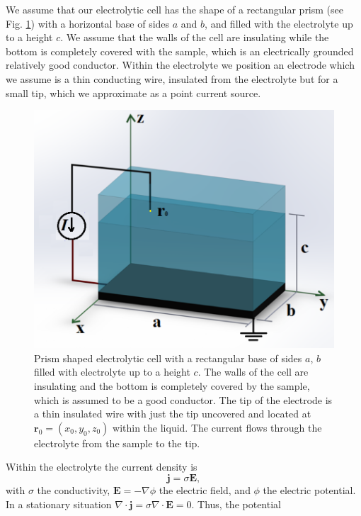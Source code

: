 \documentclass[review,sort&compress]{cas-sc}
\begin{document}
We assume that our electrolytic cell has the shape of a rectangular
prism (see Fig. \ref{f:celda}) with a horizontal base of sides $a$ and $b$, and
filled with the electrolyte up to a height $c$. We assume that the
walls of the cell are insulating while the bottom is completely
covered with the sample, which is an
electrically grounded relatively good conductor. Within the electrolyte we position an electrode
which we assume is a thin conducting wire, insulated from the electrolyte
but for a small tip, which we approximate as a
point current source.
\begin{figure}
  \centering
  \includegraphics[width=\textwidth]{fig1.png}
  \caption{Prism shaped electrolytic cell with a rectangular base of
    sides $a$, $b$ filled with electrolyte up to a height $c$. The
    walls of the cell are insulating and the bottom is completely
    covered by the sample, which is assumed to be a good
    conductor. The tip of the electrode is a thin insulated wire
    with just the tip uncovered and located at $\bm r_0=(x_0,y_0,z_0)$ within the
    liquid. The current flows through the electrolyte from the sample
    to the tip.}
  \label{f:celda}
\end{figure}
Within the electrolyte the current density is
\begin{equation}
  \label{eq:j}
  \bm j=\sigma\bm E,
\end{equation}
with
$\sigma$ the conductivity, $\bm E=-\nabla\phi$ the electric field,
and $\phi$ the electric potential. In a
stationary situation
$\nabla\cdot \bm j = \sigma\nabla\cdot\bm E=0$. Thus, the potential
\end{document}
